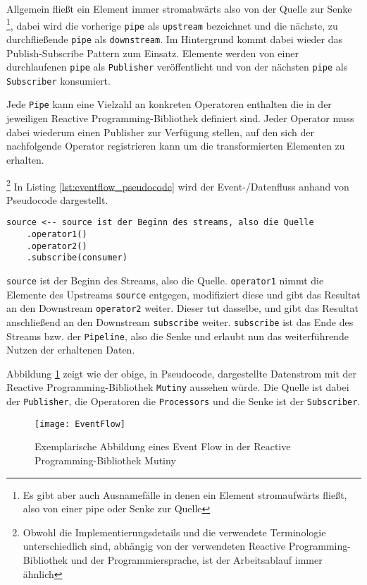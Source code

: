 Allgemein fließt ein Element immer stromabwärts also von der Quelle zur Senke
\footnote{Es gibt aber auch Ausnamefälle in denen ein Element stromaufwärts fließt, also von einer pipe oder Senke zur Quelle},
dabei wird die vorherige \verb|pipe| als \verb|upstream| bezeichnet und die nächste, zu durchfließende \verb|pipe| als \verb|downstream|.
Im Hintergrund kommt dabei wieder das Publish-Subscribe Pattern zum Einsatz. Elemente werden von einer durchlaufenen \verb|pipe| als \verb|Publisher|
veröffentlicht und von der nächsten \verb|pipe| als \verb|Subscriber| konsumiert.

Jede \verb|Pipe| kann eine Vielzahl an konkreten Operatoren enthalten die in der jeweiligen Reactive Programming-Bibliothek definiert sind.
Jeder Operator muss dabei wiederum einen Publisher zur Verfügung stellen, auf den sich der nachfolgende Operator registrieren kann
um die transformierten Elementen zu erhalten.

\footnote{Obwohl die Implementierungsdetails und die verwendete Terminologie unterschiedlich sind, abhängig von der verwendeten Reactive Programming-Bibliothek
  und der Programmiersprache, ist der Arbeitsablauf immer ähnlich}
In Listing \ref{lst:eventflow_pseudocode} wird der Event-/Datenfluss anhand von Pseudocode dargestellt.
\begin{lstlisting}[caption=Pseudocode Event-/Datenfluss, captionpos=b, label=lst:eventflow_pseudocode]
source <-- source ist der Beginn des streams, also die Quelle
	.operator1() 
	.operator2() 
	.subscribe(consumer)
\end{lstlisting}
\verb|source| ist der Beginn des Streams, also die Quelle. \verb|operator1| nimmt die Elemente des Upstreams \verb|source| entgegen,
modifiziert diese und gibt das Resultat an den Downstream \verb|operator2| weiter.
Dieser tut dasselbe, und gibt das Resultat anschließend an den Downstream \verb|subscribe| weiter.
\verb|subscribe| ist das Ende des Streams bzw. der \verb|Pipeline|, also die Senke und erlaubt nun das weiterführende Nutzen der erhaltenen Daten.


Abbildung \ref{fig:eventflow_mutiny} zeigt wie der obige, in Pseudocode, dargestellte Datenstrom
mit der Reactive Programming-Bibliothek \verb|Mutiny| aussehen würde.
Die Quelle ist dabei der \verb|Publisher|, die Operatoren die \verb|Processors| und die Senke ist der \verb|Subscriber|.

\begin{figure}[ht!]
  \centering
  \texttt{[image: EventFlow]}
  \caption{Exemplarische Abbildung eines Event Flow in der Reactive Programming-Bibliothek Mutiny \parencite{MutinyEventFlow}}
  \label{fig:eventflow_mutiny}
\end{figure}

